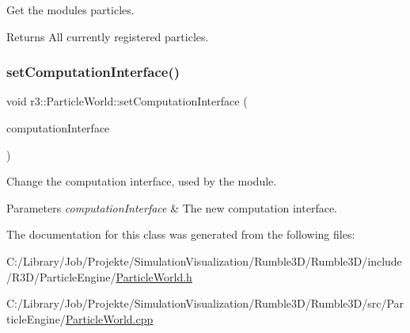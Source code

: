 Get the module\textquotesingle{}s particles. 

\begin{DoxyReturn}{Returns}
All currently registered particles. 
\end{DoxyReturn}
\mbox{\label{classr3_1_1_particle_world_adf5630d53659e9ced254d33990f15a9d}} 
\subsubsection{\texorpdfstring{set\+Computation\+Interface()}{setComputationInterface()}}
{\footnotesize\ttfamily void r3\+::\+Particle\+World\+::set\+Computation\+Interface (\begin{DoxyParamCaption}\item[{\mbox{\hyperlink{classr3_1_1_particle_engine_c_i}{Particle\+Engine\+CI}} $\ast$}]{computation\+Interface }\end{DoxyParamCaption})}



Change the computation interface, used by the module. 


\begin{DoxyParams}{Parameters}
{\em computation\+Interface} & The new computation interface. \\
\hline
\end{DoxyParams}


The documentation for this class was generated from the following files\+:\begin{DoxyCompactItemize}
\item 
C\+:/\+Library/\+Job/\+Projekte/\+Simulation\+Visualization/\+Rumble3\+D/\+Rumble3\+D/include/\+R3\+D/\+Particle\+Engine/\mbox{\hyperlink{_particle_world_8h}{Particle\+World.\+h}}\item 
C\+:/\+Library/\+Job/\+Projekte/\+Simulation\+Visualization/\+Rumble3\+D/\+Rumble3\+D/src/\+Particle\+Engine/\mbox{\hyperlink{_particle_world_8cpp}{Particle\+World.\+cpp}}\end{DoxyCompactItemize}
